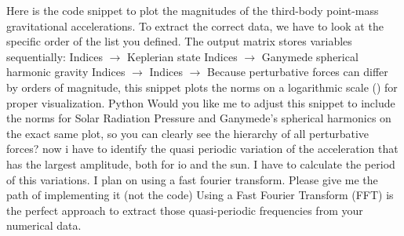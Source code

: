 \markdownRendererInterblockSeparator
{}Here is the code snippet to plot the magnitudes of the third-body point-mass gravitational accelerations.\markdownRendererInterblockSeparator
{}To extract the correct data, we have to look at the specific order of the  list you defined. The output matrix stores variables sequentially:\markdownRendererInterblockSeparator
{}\markdownRendererUlBegin
\markdownRendererUlItem Indices  $\rightarrow$ Keplerian state\markdownRendererUlItemEnd 
\markdownRendererUlItem Indices  $\rightarrow$ Ganymede spherical harmonic gravity\markdownRendererUlItemEnd 
\markdownRendererUlItem Indices  $\rightarrow$ \markdownRendererUlItemEnd 
\markdownRendererUlItem Indices  $\rightarrow$ \markdownRendererUlItemEnd 
\markdownRendererUlEnd \markdownRendererInterblockSeparator
{}Because perturbative forces can differ by orders of magnitude, this snippet plots the norms on a logarithmic scale () for proper visualization.\markdownRendererInterblockSeparator
{}Python\markdownRendererInterblockSeparator
{}\markdownRendererInterblockSeparator
{}Would you like me to adjust this snippet to include the norms for Solar Radiation Pressure and Ganymede's spherical harmonics on the exact same plot, so you can clearly see the hierarchy of all perturbative forces?\markdownRendererInterblockSeparator
{}\markdownRendererThematicBreak{}\markdownRendererInterblockSeparator
{}
\markdownRendererSectionEnd \markdownRendererSectionBegin
{}\markdownRendererInterblockSeparator
{}now i have to identify the quasi periodic variation of the acceleration that has the largest amplitude, both for io and the sun. I have to calculate the period of this variations. I plan on using a fast fourier transform. Please give me the path of implementing it (not the code)\markdownRendererInterblockSeparator
{}
\markdownRendererSectionEnd \markdownRendererSectionBegin
{}\markdownRendererInterblockSeparator
{}Using a Fast Fourier Transform (FFT) is the perfect approach to extract those quasi-periodic frequencies from your numerical data.\markdownRendererInterblockSeparator
